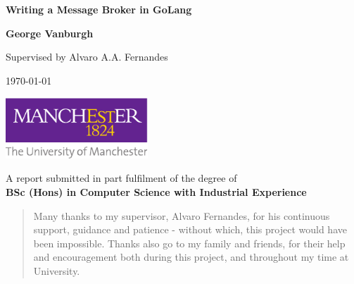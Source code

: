 \documentclass[a4paper,12pt,titlepage]{report}
\begin{document}
  
  

  \begin{titlepage}
    \begin{center}
        \vspace*{1cm}

        \Huge
        \textbf{Writing a Message Broker in GoLang}

        \vspace{2.0cm}
        \LARGE

        \textbf{George Vanburgh}

        \vspace{0.5cm}
        Supervised by Alvaro A.A. Fernandes

        \vspace{0.5cm}
        \today

        \vfill

        \includegraphics[width=0.4\textwidth]{figures/manchesterLogo}

        \vspace{0.8cm}
        \large

        A report submitted in part fulfilment of the degree of \\
        \textbf{BSc (Hons) in Computer Science with Industrial Experience}

    \end{center}
  \end{titlepage}

  \begin{abstract}
    
  \end{abstract}

  \renewcommand{\abstractname}{Acknowledgements}
  \begin{abstract}
    Many thanks to my supervisor, Alvaro Fernandes, for his continuous support,
    guidance and patience - without which, this project would have been
    impossible. Thanks also go to my family and friends, for their help and
    encouragement both during this project, and throughout my time at
    University.
  \end{abstract}

  \tableofcontents

  \newpage

  

  

  

  

  

  

  \begin{appendix}
    
  \end{appendix}

  \newpage

  \printglossaries

  \newpage

  \printbibliography
\end{document}
